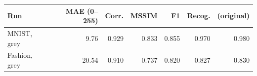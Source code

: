 \begin{tabular}{lrrrrrr}
\hline
Run & MAE (0--255) & Corr. & MSSIM & F1 & Recog. & (original) \\
\hline
MNIST, grey & 9.76 & 0.929 & 0.833 & 0.855 & 0.970 & 0.980 \\
Fashion, grey & 20.54 & 0.910 & 0.737 & 0.820 & 0.827 & 0.830 \\
\hline
\end{tabular}
